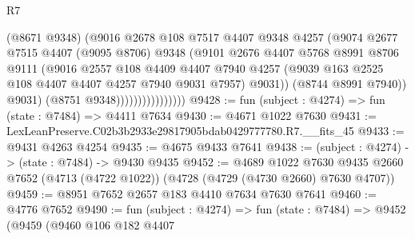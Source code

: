 \begin{lexlean}{R7}
\begin{coremodule}
                                  (@8671 @9348)
                                  (@9016
                                    @2678
                                    @108
                                    @7517
                                    @4407
                                    @9348
                                    @4257
                                    (@9074
                                      @2677
                                      @7515
                                      @4407
                                      (@9095 @8706)
                                      @9348
                                      (@9101
                                        @2676
                                        @4407
                                        @5768
                                        @8991
                                        @8706
                                        @9111
                                        (@9016
                                          @2557
                                          @108
                                          @4409
                                          @4407
                                          @7940
                                          @4257
                                          (@9039
                                            @163
                                            @2525
                                            @108
                                            @4407
                                            @4407
                                            @4257
                                            @7940
                                            @9031
                                            @7957)
                                          @9031))
                                      (@8744 @8991 @7940))
                                    @9031)
                                  (@8751 @9348))))))))))))))))
@9428 := fun (subject : @4274) => fun (state : @7484) => @4411 @7634
@9430 := @4671 @1022 @7630
@9431 := LexLeanPreserve.C02b3b2933e29817905bdab0429777780.R7.__fits_45
@9433 := @9431 @4263 @4254
@9435 := @4675 @9433 @7641
@9438 := (subject : @4274) -> (state : @7484) -> @9430 @9435
@9452 := @4689
    @1022
    @7630
    @9435
    @2660
    @7652
    (@4713 (@4722 @1022))
    (@4728 (@4729 (@4730 @2660) @7630 @4707))
@9459 := @8951 @7652 @2657 @183 @4410 @7634 @7630 @7641
@9460 := @4776 @7652
@9490 := fun (subject : @4274) =>
  fun (state : @7484) =>
  @9452
    (@9459
      (@9460
        @106
        @182
        @4407

\end{coremodule}
\end{lexlean}

